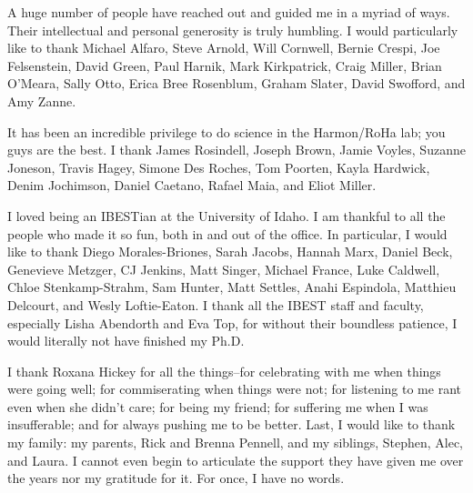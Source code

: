 A huge number of people have reached out and guided me in a myriad of ways. Their intellectual and personal generosity is truly humbling. I would particularly like to thank Michael Alfaro, Steve Arnold, Will Cornwell, Bernie Crespi, Joe Felsenstein, David Green, Paul Harnik, Mark Kirkpatrick, Craig Miller, Brian O'Meara, Sally Otto, Erica Bree Rosenblum, Graham Slater, David Swofford, and Amy Zanne.

It has been an incredible privilege to do science in the Harmon/RoHa lab; you guys are the best. I thank James Rosindell, Joseph Brown, Jamie Voyles, Suzanne Joneson, Travis Hagey, Simone Des Roches, Tom Poorten, Kayla Hardwick, Denim Jochimson,  Daniel Caetano, Rafael Maia, and Eliot Miller.

I loved being an IBESTian at the University of Idaho. I am thankful to all the people who made it so fun, both in and out of the office. In particular, I would like to thank Diego Morales-Briones, Sarah Jacobs, Hannah Marx, Daniel Beck, Genevieve Metzger, CJ Jenkins, Matt Singer, Michael France, Luke Caldwell, Chloe Stenkamp-Strahm, Sam Hunter, Matt Settles, Anahi Espindola, Matthieu Delcourt, and Wesly Loftie-Eaton. I thank all the IBEST staff and faculty, especially Lisha Abendorth and Eva Top, for without their boundless patience, I would literally not have finished my Ph.D.

I thank Roxana Hickey for all the things--for celebrating with me when things were going well; for commiserating when things were not; for listening to me rant even when she didn't care; for being my friend; for suffering me when I was insufferable; and for always pushing me to be better. Last, I would like to thank my family: my parents, Rick and Brenna Pennell, and my siblings, Stephen, Alec, and Laura. I cannot even begin to articulate the support they have given me over the years nor my gratitude for it. For once, I have no words.


